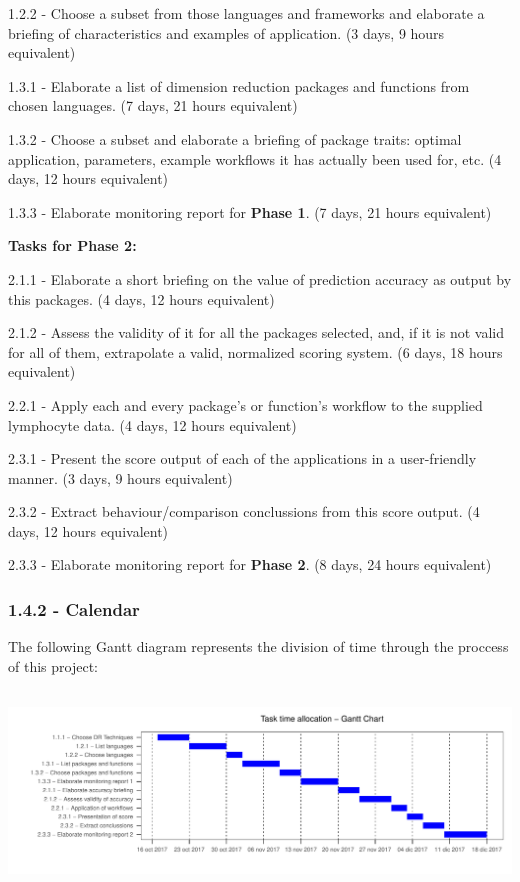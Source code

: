 \documentclass[]{article}
\begin{document}
1.2.2 - Choose a subset from those languages and frameworks and
elaborate a briefing of characteristics and examples of application. (3
days, 9 hours equivalent)

1.3.1 - Elaborate a list of dimension reduction packages and functions
from chosen languages. (7 days, 21 hours equivalent)

1.3.2 - Choose a subset and elaborate a briefing of package traits:
optimal application, parameters, example workflows it has actually been
used for, etc. (4 days, 12 hours equivalent)

1.3.3 - Elaborate monitoring report for \textbf{Phase 1}. (7 days, 21
hours equivalent)

\textbf{Tasks for Phase 2:}

2.1.1 - Elaborate a short briefing on the value of prediction accuracy
as output by this packages. (4 days, 12 hours equivalent)

2.1.2 - Assess the validity of it for all the packages selected, and, if
it is not valid for all of them, extrapolate a valid, normalized scoring
system. (6 days, 18 hours equivalent)

2.2.1 - Apply each and every package's or function's workflow to the
supplied lymphocyte data. (4 days, 12 hours equivalent)

2.3.1 - Present the score output of each of the applications in a
user-friendly manner. (3 days, 9 hours equivalent)

2.3.2 - Extract behaviour/comparison conclussions from this score
output. (4 days, 12 hours equivalent)

2.3.3 - Elaborate monitoring report for \textbf{Phase 2}. (8 days, 24
hours equivalent)

\subsubsection{1.4.2 - Calendar}\label{calendar}

The following Gantt diagram represents the division of time through the
proccess of this project:

\includegraphics[height=200px,]{gimenezGredillaDaniel-TFM-REPORT_files/figure-latex/calendar-1}
\end{document}
